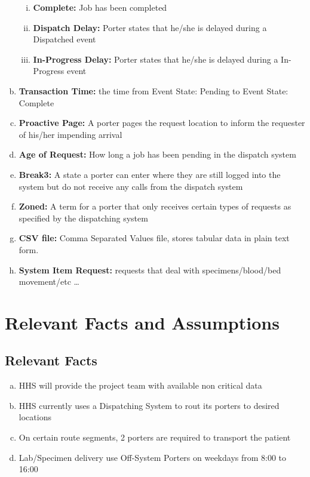 \documentclass[paper=letter, fontsize=10pt]{scrartcl}
\numberwithin{equation}{section}		%
\numberwithin{figure}{section}			%
\numberwithin{table}{section}				%
\begin{document}
\begin{enumerate}[(a)]
\begin{enumerate}[(i)]
		\item \textbf{Complete:} Job has been completed
		\item \textbf{Dispatch Delay:} Porter states that he/she is delayed during a Dispatched event
		\item \textbf{In-Progress Delay:} Porter states that he/she is delayed during a In-Progress event
	\end{enumerate} 
	\item \textbf{Transaction Time:} the time from Event State: Pending to Event State: Complete
	\item \textbf{Proactive Page:} A porter pages the request location to inform the requester of his/her impending arrival      
	\item \textbf{Age of Request:} How long a job has been pending in the dispatch system
	\item \textbf{Break3:} A state a porter can enter where they are still logged into the system but do not receive any calls from the dispatch system
	\item \textbf{Zoned:} A term for a porter that only receives certain types of requests as specified by the dispatching system 
	\item \textbf{CSV file:} Comma Separated Values file, stores tabular data in plain text form. 
	\item \textbf{System Item Request:} requests that deal with specimens/blood/bed movement/etc \ldots
\end{enumerate}

\section{Relevant Facts and Assumptions}
\subsection{Relevant Facts}
\begin{enumerate}[(a)]
	\item HHS will provide the project team with available non critical data
	\item HHS currently uses a Dispatching System to rout its porters to desired locations
	\item On certain route segments, 2 porters are required to transport the patient 
	\item Lab/Specimen delivery use Off-System Porters on weekdays from 8:00 to 16:00
\end{enumerate}
\end{document}
